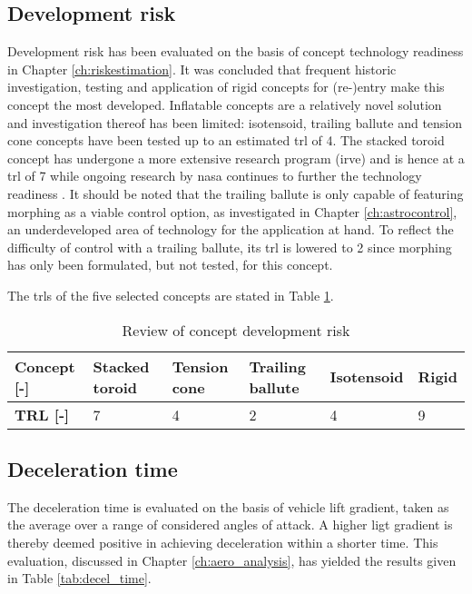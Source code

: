 \subsection{Development risk}
Development risk has been evaluated on the basis of concept technology readiness in Chapter \ref{ch:riskestimation}. It was concluded that frequent historic investigation, testing and application of rigid concepts for (re-)entry make this concept the most developed. Inflatable concepts are a relatively novel solution and investigation thereof has been limited: isotensoid, trailing ballute and tension cone concepts have been tested up to an estimated \gls{trl} of 4. The stacked toroid concept has undergone a more extensive research program (\acrfull{irve}) and is hence at a \gls{trl} of 7 while ongoing research by \gls{nasa} continues to further the technology readiness \cite{Dillman2014}. It should be noted that the trailing ballute is only capable of featuring morphing as a viable control option, as investigated in Chapter \ref{ch:astrocontrol}, an underdeveloped area of technology for the application at hand. To reflect the difficulty of control with a trailing ballute, its \gls{trl} is lowered to 2 since morphing has only been formulated, but not tested, for this concept.

The \glspl{trl} of the five selected concepts are stated in Table \ref{tab:gls_rev}.

\begin{table}[h]
\caption{Review of concept development risk}
\begin{tabular}{|l|l|l|l|l|l|}
\hline
\textbf{Concept {[}-{]}} & Stacked toroid & Tension cone & Trailing ballute & Isotensoid & Rigid \\ \hline
\textbf{TRL {[}-{]}}     &\cellcolor{green!70} 7  &\cellcolor{yellow!75}  4   &\cellcolor{red!60} 2 & \cellcolor{yellow!75}      4          &\cellcolor{green!70} 9     \\ \hline
\end{tabular}
\label{tab:gls_rev}
\end{table}

\subsection{Deceleration time}
The deceleration time is evaluated on the basis of vehicle lift gradient, taken as the average over a range of considered angles of attack. A higher ligt gradient is thereby deemed positive in achieving deceleration within a shorter time. This evaluation, discussed in Chapter \ref{ch:aero_analysis}, has yielded the results given in Table \ref{tab:decel_time}.

